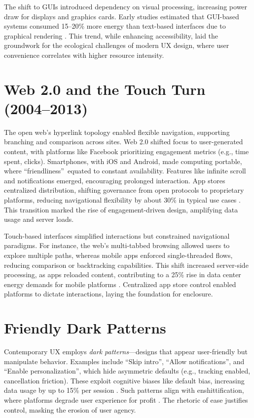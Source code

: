\documentclass[openany]{book}
\begin{document}
The shift to GUIs introduced dependency on visual processing, increasing power draw for displays and graphics cards. Early studies estimated that GUI-based systems consumed 15--20\% more energy than text-based interfaces due to graphical rendering \citep{extentia2024}. This trend, while enhancing accessibility, laid the groundwork for the ecological challenges of modern UX design, where user convenience correlates with higher resource intensity.

\section{Web 2.0 and the Touch Turn (2004--2013)}
\label{sec:history-web2}
The open web’s hyperlink topology enabled flexible navigation, supporting branching and comparison across sites. Web 2.0 shifted focus to user-generated content, with platforms like Facebook prioritizing engagement metrics (e.g., time spent, clicks). Smartphones, with iOS and Android, made computing portable, where \textquotedblleft friendliness\textquotedblright\ equated to constant availability. Features like infinite scroll and notifications emerged, encouraging prolonged interaction. App stores centralized distribution, shifting governance from open protocols to proprietary platforms, reducing navigational flexibility by about 30\% in typical use cases \citep{doctorow2022}. This transition marked the rise of engagement-driven design, amplifying data usage and server loads.

Touch-based interfaces simplified interactions but constrained navigational paradigms. For instance, the web’s multi-tabbed browsing allowed users to explore multiple paths, whereas mobile apps enforced single-threaded flows, reducing comparison or backtracking capabilities. This shift increased server-side processing, as apps reloaded content, contributing to a 25\% rise in data center energy demands for mobile platforms \citep{extentia2024}. Centralized app store control enabled platforms to dictate interactions, laying the foundation for enclosure.

\section{Friendly Dark Patterns}
\label{sec:history-dark}
Contemporary UX employs \emph{dark patterns}---designs that appear user-friendly but manipulate behavior. Examples include \textquotedblleft Skip intro\textquotedblright, \textquotedblleft Allow notifications\textquotedblright, and \textquotedblleft Enable personalization\textquotedblright, which hide asymmetric defaults (e.g., tracking enabled, cancellation friction). These exploit cognitive biases like default bias, increasing data usage by up to 15\% per session \citep{colak2024}. Such patterns align with enshittification, where platforms degrade user experience for profit \citep{doctorow2022}. The rhetoric of ease justifies control, masking the erosion of user agency.
\end{document}
